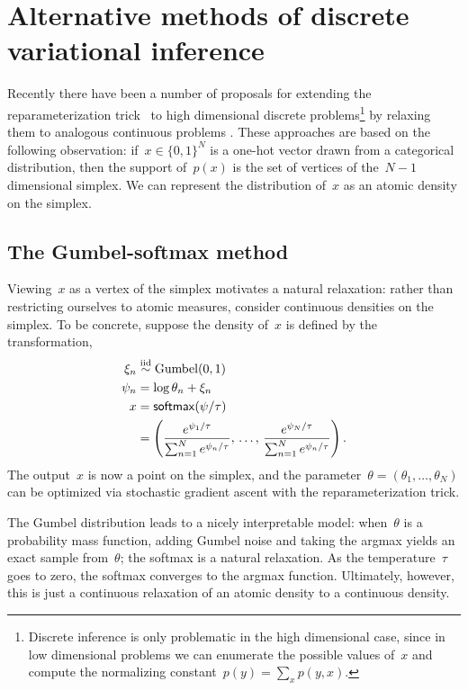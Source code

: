 \section{Alternative methods of discrete variational inference}

Recently there have been a number of proposals for extending the
reparameterization trick~\citep{rezende2014stochastic, Kingma2014} to
high dimensional discrete problems\footnote{Discrete inference is only
  problematic in the high dimensional case, since in low dimensional
  problems we can enumerate the possible values of~$x$ and compute the
  normalizing constant~$p(y) = \sum_x p(y, x)$.} by relaxing them to
analogous continuous problems \citep{maddison2016concrete,
  jang2016categorical, kusner2016gans}.  These approaches are based on
the following observation: if~$x \in \{0,1\}^N$ is a one-hot vector
drawn from a categorical distribution, then the support of~$p(x)$ is
the set of vertices of the~$N-1$ dimensional simplex.  We can
represent the distribution of~$x$ as an atomic density on the simplex.

\subsection{The Gumbel-softmax method}
Viewing~$x$ as a vertex of the simplex motivates a natural relaxation:
rather than restricting ourselves to atomic measures,
consider continuous densities on the simplex. To be concrete, suppose
the density of~$x$ is defined by the transformation,
\begin{align*}
  \xi_n &\stackrel{\text{iid}}{\sim} \mathrm{Gumbel}(0, 1) \\
  \psi_n & = \log \theta_n + \xi_n  \\
  x &=  \mathsf{softmax}(\psi / \tau) \\
        &=\left(\frac{e^{\psi_1 / \tau}}{\sum_{n=1}^N e^{\psi_n / \tau}},
      \,\ldots,\,
      \frac{e^{\psi_N / \tau}}{\sum_{n=1}^N e^{\psi_n / \tau}} \right).
\end{align*}
The output~$x$ is now a point on the simplex, and the
parameter~${\theta = (\theta_1, \ldots, \theta_N)}$ can be optimized
via stochastic gradient ascent with the reparameterization trick.

The Gumbel distribution leads to a nicely interpretable model:
when~$\theta$ is a probability mass function, adding Gumbel noise and
taking the argmax yields an exact sample from~$\theta$; the softmax is
a natural relaxation. As the temperature~$\tau$ goes to zero, the
softmax converges to the argmax function. Ultimately, however, this is
just a continuous relaxation of an atomic density to a continuous
density.

